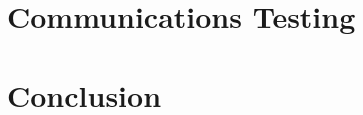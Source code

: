 \documentclass[a4paper,11pt]{report}
\begin{document}
\chapter{Communications Testing}
\graphicspath{{./Sections/Images/}}


\chapter{Conclusion}
\graphicspath{{./Sections/Images/}}


\clearpage
\printbibliography[heading=bibintoc]
\end{document}
